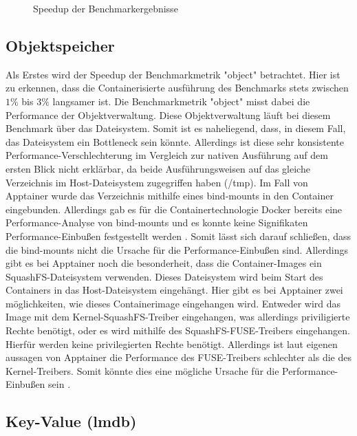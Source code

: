 \begin{figure}
    \centering
    
    \caption{Speedup der Benchmarkergebnisse}
    \label{fig:speedup}
\end{figure}

\FloatBarrier

\subsection{Objektspeicher}

Als Erstes wird der Speedup der Benchmarkmetrik "object" betrachtet. Hier ist zu erkennen, dass die Containerisierte ausführung des Benchmarks stets zwischen $1\%$ bis $3\%$ langsamer ist. Die Benchmarkmetrik "object" misst dabei die Performance der Objektverwaltung. Diese Objektverwaltung läuft bei diesem Benchmark über das Dateisystem. Somit ist es naheliegend, dass, in diesem Fall, das Dateisystem ein Bottleneck sein könnte. Allerdings ist diese sehr konsistente Performance-Verschlechterung im Vergleich zur nativen Ausführung auf dem ersten Blick nicht erklärbar, da beide Ausführungsweisen auf das gleiche Verzeichnis im Host-Dateisystem zugegriffen haben (/tmp). Im Fall von Apptainer wurde das Verzeichnis mithilfe eines bind-mounts in den Container eingebunden. Allerdings gab es für die Containertechnologie Docker bereits eine Performance-Analyse von bind-mounts und es konnte keine Signifikaten Performance-Einbußen festgestellt werden \cite[Vgl. 4]{dordevicFileSystemPerformance2022}. Somit lässt sich darauf schließen, dass die bind-mounts nicht die Ursache für die Performance-Einbußen sind. Allerdings gibt es bei Apptainer noch die besonderheit, dass die Container-Images ein SquashFS-Dateisystem verwenden. Dieses Dateisystem wird beim Start des Containers in das Host-Dateisystem eingehängt. Hier gibt es bei Apptainer zwei möglichkeiten, wie dieses Containerimage eingehangen wird. Entweder wird das Image mit dem Kernel-SquashFS-Treiber eingehangen, was allerdings priviligierte Rechte benötigt, oder es wird mithilfe des SquashFS-FUSE-Treibers eingehangen. Hierfür werden keine privilegierten Rechte benötigt. Allerdings ist laut eigenen aussagen von Apptainer die Performance des FUSE-Treibers schlechter als die des Kernel-Treibers. Somit könnte dies eine mögliche Ursache für die Performance-Einbußen sein \cite{apptainerSecurityApptainerApptainer}.  

\subsection{Key-Value (lmdb)}

